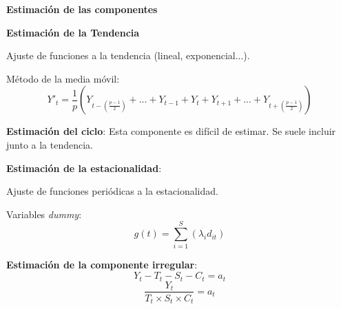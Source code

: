 \documentclass[10pt,a4paper,twoside]{beamer}
\begin{document}
\begin{frame}

\textbf{Estimación de las componentes}\\

\begin{itemize*}
\item \textbf{Estimación de la Tendencia}
    \begin{itemize*}
    \item Ajuste de funciones a la tendencia (lineal, exponencial...).
    \item Método de la media móvil:
        \begin{equation*}
        Y'_{t} = \frac{1}{p}\left(Y_{t-\left(\frac{p-1}{2}\right)}+...+Y_{t-1}+Y_t+Y_{t+1}+...+Y_{t+\left(\frac{p-1}{2}\right)}\right)
        \end{equation*}
    \end{itemize*}
\item \textbf{Estimación del ciclo}: Esta componente es difícil de estimar. Se suele incluir junto a la tendencia.
\item \textbf{Estimación de la estacionalidad}:
    \begin{itemize*}
    \item Ajuste de funciones periódicas a la estacionalidad.
    \item Variables \textit{dummy}:
        \begin{equation*}
        g(t) = \sum_{i=1}^{S}(\lambda_{i} d_{it})
        \end{equation*}
    \end{itemize*}
\item \textbf{Estimación de la componente irregular}:
\begin{equation*}
    Y_t - T_t - S_t - C_t = a_t
\end{equation*}
\begin{equation*}
    \frac{Y_t}{T_t \times S_t \times C_t} = a_t
\end{equation*}
\end{itemize*}

\end{frame}

\end{document}
